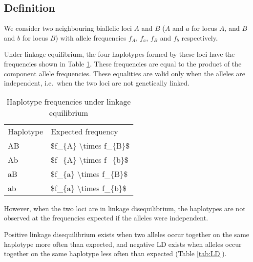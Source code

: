 \documentclass[]{book}
\begin{document}
\hypertarget{definition}{%
\subsection{Definition}\label{definition}}

We consider two neighbouring biallelic loci \(A\) and \(B\) (\(A\) and \(a\) for
locus \(A\), and \(B\) and \(b\) for locus \(B\)) with allele frequencies
\(f_{A}\), \(f_{a}\), \(f_{B}\) and \(f_{b}\) respectively.

Under linkage equilibrium, the four haplotypes formed by these loci have
the frequencies shown in Table \ref{tab:LE}. These frequencies are equal
to the product of the component allele frequencies. These equalities are
valid only when the alleles are independent, i.e.~when the two loci are
not genetically linked.

\begin{table}

\caption{\label{tab:LE}Haplotype frequencies under linkage equilibrium}
\centering
\begin{tabular}[t]{ll}
\toprule
Haplotype & Expected frequency\\
AB & \$f\_\{A\} \textbackslash{}times f\_\{B\}\$\\
Ab & \$f\_\{A\} \textbackslash{}times f\_\{b\}\$\\
aB & \$f\_\{a\} \textbackslash{}times f\_\{B\}\$\\
ab & \$f\_\{a\} \textbackslash{}times f\_\{b\}\$\\
\bottomrule
\end{tabular}
\end{table}

However, when the two loci are in linkage disequilibrium, the haplotypes
are not observed at the frequencies expected if the alleles were
independent.

Positive linkage disequilibrium exists when two alleles occur together
on the same haplotype more often than expected, and negative LD exists
when alleles occur together on the same haplotype less often than
expected (Table \ref{tab:LD}).
\end{document}
